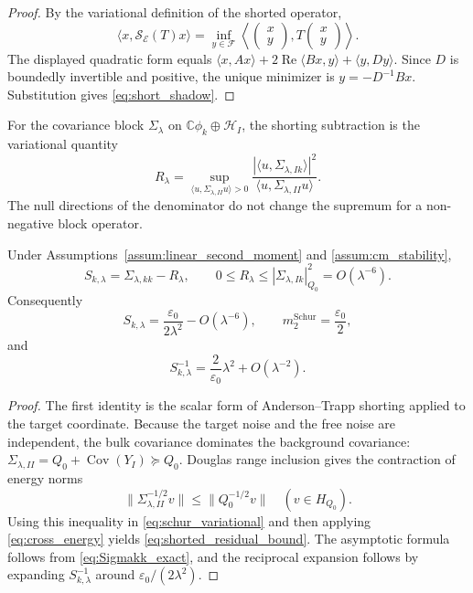 \begin{proof}
By the variational definition of the shorted operator,
\[
  \langle x,\mathcal{S}_{\mathcal{E}}(T)x\rangle
  =
  \inf_{y\in\mathcal{F}}
  \left\langle
  \begin{pmatrix}x\\y\end{pmatrix},
  T
  \begin{pmatrix}x\\y\end{pmatrix}
  \right\rangle .
\]
The displayed quadratic form equals
$\langle x,Ax\rangle+2\operatorname{Re}\langle Bx,y\rangle+\langle y,Dy\rangle$.
Since $D$ is boundedly invertible and positive, the unique minimizer is
$y=-D^{-1}Bx$.  Substitution gives \eqref{eq:short_shadow}.
\end{proof}

For the covariance block $\Sigma_\lambda$ on
$\mathbb{C}\phi_k\oplus\mathcal{H}_I$, the shorting subtraction is the
variational quantity
\begin{equation}
 R_\lambda
 =
 \sup_{\langle u,\Sigma_{\lambda,II}u\rangle>0}
 \frac{|\langle u,\Sigma_{\lambda,Ik}\rangle|^2}
      {\langle u,\Sigma_{\lambda,II}u\rangle}.
 \label{eq:schur_variational}
\end{equation}
The null directions of the denominator do not change the supremum for a
non-negative block operator.

\begin{proposition}
\label{prop:rank_one_shorted_residual}
Under Assumptions~\ref{assum:linear_second_moment} and
\ref{assum:cm_stability},
\begin{equation}
  S_{k,\lambda}
  =\Sigma_{\lambda,kk}-R_\lambda,
  \qquad
  0\le R_\lambda\le |\Sigma_{\lambda,Ik}|_{Q_0}^2=O(\lambda^{-6}).
  \label{eq:shorted_residual_bound}
\end{equation}
Consequently
\begin{equation}
  S_{k,\lambda}
  =
  \frac{\varepsilon_0}{2\lambda^2}-O(\lambda^{-6}),
  \qquad
  m_2^{\mathrm{Schur}}=\frac{\varepsilon_0}{2},
  \label{eq:Schur_asympt}
\end{equation}
and
\[
  S_{k,\lambda}^{-1}
  =
  \frac{2}{\varepsilon_0}\lambda^2+O(\lambda^{-2}).
\]
\end{proposition}

\begin{proof}
The first identity is the scalar form of Anderson--Trapp shorting applied to
the target coordinate.  Because the target noise and the free noise are
independent, the bulk covariance dominates the background covariance:
$\Sigma_{\lambda,II}=Q_0+\operatorname{Cov}(Y_I)\succeq Q_0$.  Douglas range
inclusion gives the contraction of energy norms
\[
  \|\Sigma_{\lambda,II}^{-1/2}v\|
  \le \|Q_0^{-1/2}v\|
  \quad (v\in H_{Q_0}).
\]
Using this inequality in \eqref{eq:schur_variational} and then applying
\eqref{eq:cross_energy} yields \eqref{eq:shorted_residual_bound}.  The
asymptotic formula follows from \eqref{eq:Sigmakk_exact}, and the reciprocal
expansion follows by expanding
$S_{k,\lambda}^{-1}$ around $\varepsilon_0/(2\lambda^2)$.
\end{proof}

